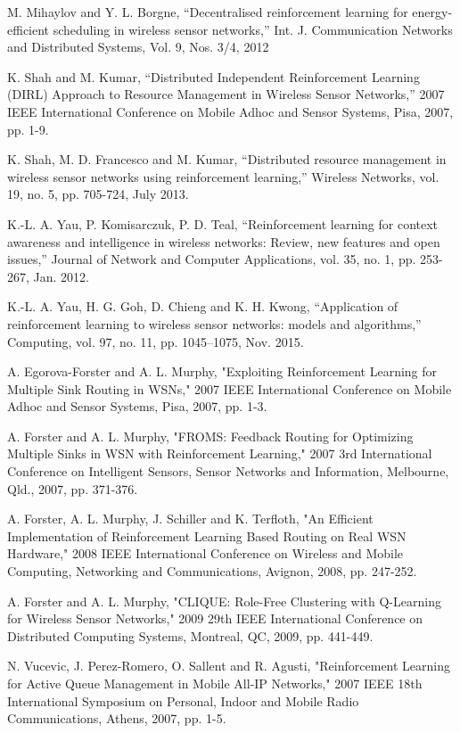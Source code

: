 \documentclass[journal]{IEEEtran}
\begin{document}
\begin{thebibliography}{1}
M. Mihaylov and Y. L. Borgne, ``Decentralised reinforcement learning for energy-efficient scheduling in wireless sensor networks,'' Int. J. Communication Networks and Distributed Systems, Vol. 9, Nos. 3/4, 2012

K. Shah and M. Kumar, ``Distributed Independent Reinforcement Learning (DIRL) Approach to Resource Management in Wireless Sensor Networks,'' 2007 IEEE International Conference on Mobile Adhoc and Sensor Systems, Pisa, 2007, pp. 1-9.

K. Shah, M. D. Francesco and M. Kumar, ``Distributed resource management in wireless sensor networks using reinforcement learning,'' Wireless Networks,
vol. 19, no. 5, pp. 705-724, July 2013.

K.-L. A. Yau, P. Komisarczuk, P. D. Teal, ``Reinforcement learning for context awareness and intelligence in wireless
networks: Review, new features and open issues,'' Journal of Network and Computer Applications, vol. 35, no. 1, pp. 253-267, Jan. 2012.

K.-L. A. Yau, H. G. Goh, D. Chieng and K. H. Kwong, ``Application of reinforcement learning to wireless sensor networks: models and algorithms,'' Computing, vol. 97, no. 11, pp. 1045–1075, Nov. 2015.

A. Egorova-Forster and A. L. Murphy, "Exploiting Reinforcement Learning for Multiple Sink Routing in WSNs," 2007 IEEE International Conference on Mobile Adhoc and Sensor Systems, Pisa, 2007, pp. 1-3.

A. Forster and A. L. Murphy, "FROMS: Feedback Routing for Optimizing Multiple Sinks in WSN with Reinforcement Learning," 2007 3rd International Conference on Intelligent Sensors, Sensor Networks and Information, Melbourne, Qld., 2007, pp. 371-376.

A. Forster, A. L. Murphy, J. Schiller and K. Terfloth, "An Efficient Implementation of Reinforcement Learning Based Routing on Real WSN Hardware," 2008 IEEE International Conference on Wireless and Mobile Computing, Networking and Communications, Avignon, 2008, pp. 247-252.

A. Forster and A. L. Murphy, "CLIQUE: Role-Free Clustering with Q-Learning for Wireless Sensor Networks," 2009 29th IEEE International Conference on Distributed Computing Systems, Montreal, QC, 2009, pp. 441-449.

N. Vucevic, J. Perez-Romero, O. Sallent and R. Agusti, "Reinforcement Learning for Active Queue Management in Mobile All-IP Networks," 2007 IEEE 18th International Symposium on Personal, Indoor and Mobile Radio Communications, Athens, 2007, pp. 1-5.


\end{thebibliography}
\end{document}
